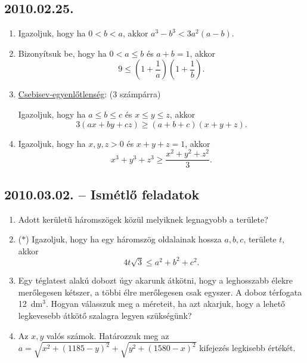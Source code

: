 \documentclass{article}
\begin{document}
\subsection*{2010.02.25.}
\begin{enumerate}
\item Igazoljuk, hogy ha $0<b<a$, akkor $a^3-b^3<3a^2(a-b)$.
\item Bizonyítsuk be, hogy ha $0<a\le b$ és $a+b=1$, akkor
$$9\le\left(1+\dfrac{1}{a}\right)\left(1+\dfrac{1}{b}\right).$$
\item \underline{Csebisev-egyenlőtlenség}: (3 számpárra)

\noindent Igazoljuk, hogy ha $a\le b \le c$ és $x\le y \le z$, akkor
$$3(ax+by+cz)\ge (a+b+c)(x+y+z).$$

\item Igazoljuk, hogy ha $x,y,z>0$ és $x+y+z=1$, akkor 
$$x^3+y^3+z^3\ge \dfrac{x^2+y^2+z^2}{3}.$$
\end{enumerate}

\subsection*{2010.03.02. -- Ismétlő feladatok}
\begin{enumerate}
\item Adott kerületű háromszögek közül melyiknek legnagyobb a területe?
\item ($*$) Igazoljuk, hogy ha egy háromszög oldalainak hossza $a,b,c$, területe $t$, akkor
$$4t\sqrt{3}\le a^2+b^2+c^2.$$
\item Egy téglatest alakú dobozt úgy akarunk átkötni, hogy a leghosszabb élekre merőlegesen kétszer, a többi élre merőlegesen csak egyszer. A doboz térfogata 12~dm$^3$. Hogyan válasszuk meg a méreteit, ha azt akarjuk, hogy a lehető legkevesebb átkötő szalagra legyen szükségünk?
\item Az $x,y$ valós számok. Határozzuk meg az 
$a=\sqrt{x^2+(1185-y)^2}+\sqrt{y^2+(1580-x)^2}$ kifejezés legkisebb értékét.
\end{enumerate}
\end{document}
